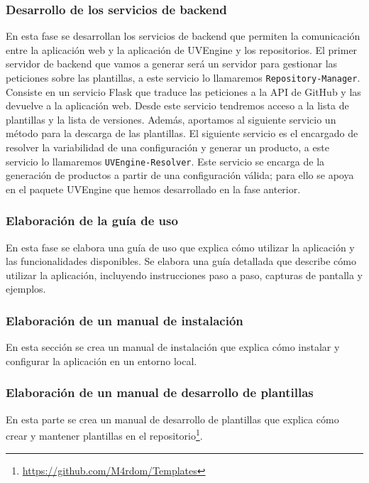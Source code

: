 \documentclass[12pt, a4paper, twoside]{article}
\begin{document}
\subsubsection{Desarrollo de los servicios de backend}
\label{sec:Desarrollo de los servicios de backend}
En esta fase se desarrollan los servicios de backend que permiten la comunicación entre la aplicación web y la aplicación de UVEngine y los repositorios.
El primer servidor de backend que vamos a generar será un servidor para gestionar las peticiones sobre las plantillas, a este servicio lo llamaremos \texttt{Repository-Manager}. 
Consiste en un servicio Flask que traduce las peticiones a la API de GitHub y las devuelve a la aplicación web. Desde este servicio tendremos acceso a la lista de plantillas y la lista de versiones.
Además, aportamos al siguiente servicio un método para la descarga de las plantillas. El siguiente servicio es el encargado de resolver la variabilidad de una configuración y generar un producto, a este servicio lo llamaremos \texttt{UVEngine-Resolver}.
Este servicio se encarga de la generación de productos a partir de una configuración válida; para ello se apoya en el paquete UVEngine que hemos desarrollado en la fase anterior.

\subsubsection{Elaboración de la guía de uso}
En esta fase se elabora una guía de uso que explica cómo utilizar la aplicación y las funcionalidades disponibles.
Se elabora una guía detallada que describe cómo utilizar la aplicación, incluyendo instrucciones paso a paso, capturas 
de pantalla y ejemplos. 
\subsubsection{Elaboración de un manual de instalación}
En esta sección se crea un manual de instalación que explica cómo instalar y configurar la aplicación en un entorno local.
\subsubsection{Elaboración de un manual de desarrollo de plantillas}
En esta parte se crea un manual de desarrollo de plantillas que explica cómo crear y mantener plantillas en el repositorio\footnote{\href{https://github.com/M4rdom/Templates}{https://github.com/M4rdom/Templates}}.
\end{document}
